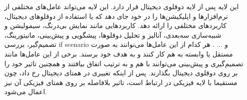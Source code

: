 این لایه پس از لایه دوقلوی دیجیتال قرار دارد. این لایه می‌تواند عامل‌های مختلفی از نرم‌افزار‌ها و اپلیکیشن‌ها را در خود جای دهد که با استفاده از دوقلو‌های دیجیتال، کاربرد‌های مختلفی را ارائه دهد. کاربرد‌هایی مانند نمایش بی‌درنگ، سیمولیشن و شبیه‌سازی سه‌بعدی، آنالیز و تحلیل دوقلو‌ها، پیشگویی و پیش‌بینی، مانیتورینگ، تصمیم‌گیر، بررسی if scenario و ... . هر کدام از این عامل‌ها می‌توانند به صورت مستقل یا وابسته به هم کار کنند و به هدف خود برسند. برخی از این عامل‌ها مانند تصمیم‌گیری و پیش‌بینی می‌توانند با هم و به ترتیب اتفاق بیافتند و همچنین تاثیر خود را بر روی دوقلوی دیجیتال بگذارند. پس از اینکه تغییری در همتای دیجیتال رخ داد، چون مستقیما با لایه فیزیکی در ارتباط است، تاثیر بلافاصله بر روی همتای فیزیکی آن نیز اعمال می‌شود.








































